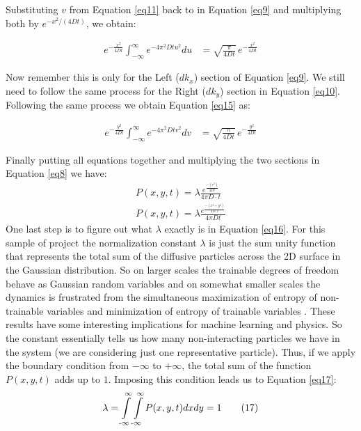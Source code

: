 Substituting $v$ from Equation \eqref{eq11} back to in Equation \eqref{eq9} and multiplying both by $e^{-x^2/(4Dt)}$, we obtain:

\begin{align*}
e^{-\frac{x^2}{4Dt}} \int_{-\infty}^{\infty} e^{-4 \pi^2 D t u^2} du &= \sqrt{\frac{\pi}{4Dt}}\, e^{-\frac{x^2}{4Dt}} \tag{14}
\label{eq14}
\end{align*}


Now remember this is only for the Left ($dk_x$) section of Equation \eqref{eq9}. We still need to follow the same process for the Right ($dk_y$) section in Equation \eqref{eq10}. Following the same process we obtain Equation \eqref{eq15} as: 

\begin{align*}
e^{-\frac{y^2}{4Dt}} \int_{-\infty}^{\infty} e^{-4 \pi^2 D t v^2} dv &= \sqrt{\frac{\pi}{4Dt}}\, e^{-\frac{y^2}{4Dt}} \tag{15}
\label{eq15}
\end{align*}

Finally putting all equations together and multiplying the two sections in Equation \eqref{eq8} we have: 
\begin{align*}
    P(x,y,t) = \lambda \frac{e^{\frac{-(r^2)}{4 D t}}}{4 \pi D \cdot t} \tag{polar} \\
    P(x,y,t) = \lambda \frac{e^{\frac{-(x^2 + y^2)}{4 D \cdot t}}}{4 \pi D t} \tag{16} 
    \label{eq16}  
\end{align*}
One last step is to figure out what $\lambda$ exactly is in Equation \eqref{eq16}. For this sample of project the normalization constant $\lambda$ is just the sum unity function that represents the total sum of the diffusive particles across the 2D surface in the Gaussian distribution. So on larger scales the trainable degrees of freedom behave as Gaussian random variables and on somewhat smaller scales the dynamics is frustrated from the simultaneous maximization of entropy of non-trainable variables and minimization of entropy of trainable variables \cite{Katsnelson2023}. These results have some interesting implications for machine learning and physics. So the constant essentially tells us how many non-interacting particles we have in the system (we are considering just one representative particle). Thus, if we apply the boundary condition from $-\infty$ to $+\infty$, the total sum of the function $P (x,y,t)$ adds up to $1$. Imposing this condition leads us to Equation \eqref{eq17}: 
\begin{align*}
    \lambda = \int\limits^{\infty}_{\text{-}\infty}\int\limits^{\infty}_{\text{-}\infty} P(x,y,t) dx dy= 1 \tag{17}
    \label{eq17}  
\end{align*}

